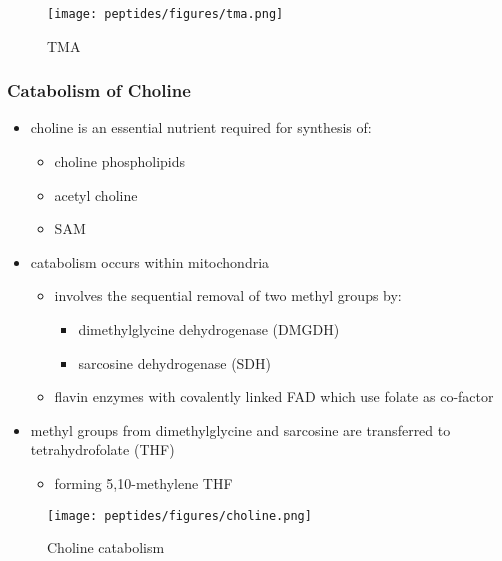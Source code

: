 \documentclass[12pt]{scrartcl}
\begin{document}
\begin{figure}[htbp]
\centering
\texttt{[image: peptides/figures/tma.png]}
\caption{\label{fig:org77a4f62}TMA}
\end{figure}

\subsubsection{Catabolism of Choline}
\label{sec:org45954e3}
\begin{itemize}
\item choline is an essential nutrient required for synthesis of:
\begin{itemize}
\item choline phospholipids
\item acetyl choline
\item SAM
\end{itemize}
\item catabolism occurs within mitochondria
\begin{itemize}
\item involves the sequential removal of two methyl groups by:
\begin{itemize}
\item dimethylglycine dehydrogenase (DMGDH)
\item sarcosine dehydrogenase (SDH)
\end{itemize}
\item flavin enzymes with covalently linked FAD which use folate as co-factor
\end{itemize}
\item methyl groups from dimethylglycine and sarcosine are transferred to
tetrahydrofolate (THF)
\begin{itemize}
\item forming 5,10-methylene THF
\end{itemize}
\end{itemize}

\begin{figure}[htbp]
\centering
\texttt{[image: peptides/figures/choline.png]}
\caption{\label{fig:org828c81d}Choline catabolism}
\end{figure}
\end{document}
